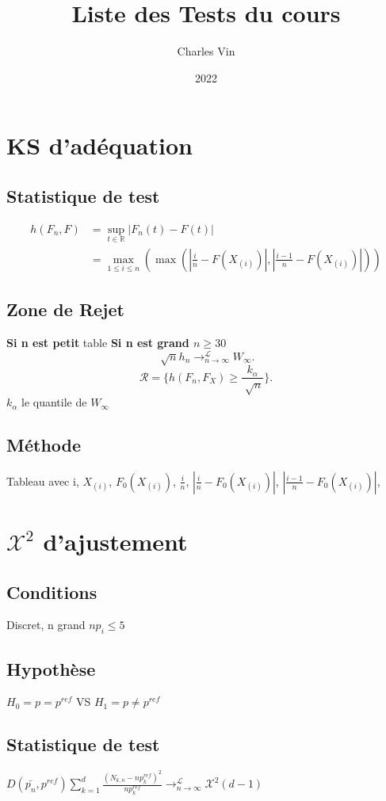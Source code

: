 \documentclass[9pt]{article}
\title{Liste des Tests du cours}
\author{Charles Vin}
\date{2022}
\theoremstyle{plain}%
\theoremstyle{definition}
\theoremstyle{remark}
\begin{document}
\footnotesize
\begin{multicols}{3}

\section{KS d'adéquation}
\subsection*{Statistique de test} 
\begin{align*}
    h(F_n, F) &= \sup _{t \in \mathbb{R}} \left| F_n(t) - F(t) \right| \\
        &= \max _{1 \leq i \leq n} ( \max ( \left| \frac{i}{n} - F(X_{(i)}) \right| , \left| \frac{i-1}{n}- F(X_{(i)}) \right|  ))
\end{align*}    

\subsection*{Zone de Rejet}
\textbf{Si n est petit} table
\textbf{Si n est grand $ n \geq 30 $ }
\[
    \sqrt[]{n}h_n \to ^{\mathcal{L}}_{n \to \infty } W_{\infty }
.\]
\[
    \mathcal{R} = \{h(F_n, F_X) \geq \frac{k_\alpha }{\sqrt[]{n}} \}
.\]
$ k_{\alpha } $ le quantile de $ W_\infty $

\subsection*{Méthode}
Tableau avec i, $X_{(i)}$, $F_0(X_{(i)})$, $\frac{i}{n}$, $|\frac{i}{n} - F_0(X_{(i)})|$, $|\frac{i-1}{n} - F_0(X_{(i)})|$, 

\section{$ \mathcal{X}^2 $ d'ajustement}
\subsection*{Conditions}
Discret, n grand $ np_i \leq 5 $ 

\subsection*{Hypothèse}
$H_0 = p = p^{ref}$ VS $H_1 = p \neq p^{ref}$

\subsection*{Statistique de test}
$D(\bar{p_n}, p^{ref}) \sum_{k=1}^{d} \frac{(N_{k,n} - np_k^{ref})^2}{n p_k^{ref}}\to ^{\mathcal{L}}_{n \to \infty } \mathcal{X}^2(d-1)$


\end{multicols}
\end{document}
